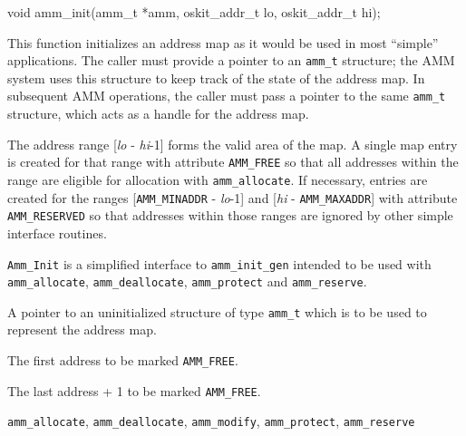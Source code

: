 \begin{apisyn}

	\funcproto void amm_init(amm_t *amm, oskit_addr_t lo, oskit_addr_t hi);
\end{apisyn}
\begin{apidesc}
	This function initializes an address map as it would be used
	in most ``simple'' applications.
	The caller must provide a pointer to an {\tt amm_t} structure;
	the AMM system uses this structure to keep track
	of the state of the address map.
	In subsequent AMM operations,
	the caller must pass a pointer to the same {\tt amm_t} structure,
	which acts as a handle for the address map.

	The address range [\emph{lo} - \emph{hi}-1]
	forms the valid area of the map.
	A single map entry is created for that range with
	attribute {\tt AMM_FREE} so that all addresses within the range
	are eligible for allocation with {\tt amm_allocate}.
	If necessary, entries are created for the ranges
	[{\tt AMM_MINADDR} - \emph{lo}-1] and
	[\emph{hi} - {\tt AMM_MAXADDR}]
	with attribute {\tt AMM_RESERVED} so that addresses within those ranges
	are ignored by other simple interface routines.

	{\tt Amm_Init} is a simplified interface to {\tt amm_init_gen}
	intended to be used with {\tt amm_allocate}, {\tt amm_deallocate},
	{\tt amm_protect} and {\tt amm_reserve}.
\end{apidesc}
\begin{apiparm}
	\item[amm]
		A pointer to an uninitialized structure of type {\tt amm_t}
		which is to be used to represent the address map.
	\item[lo]
		The first address to be marked {\tt AMM_FREE}.
	\item[hi]
		The last address + 1 to be marked {\tt AMM_FREE}.
\end{apiparm}
\begin{apirel}
	{\tt amm_allocate}, {\tt amm_deallocate}, {\tt amm_modify},
	{\tt amm_protect}, {\tt amm_reserve}
\end{apirel}


